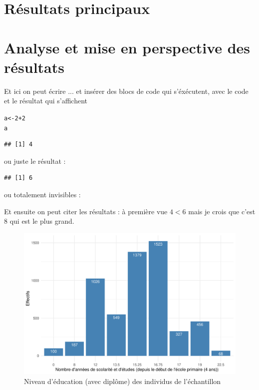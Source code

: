 \documentclass[a4paper, french, 11 pt]{article}\usepackage[]{graphicx}\usepackage[]{xcolor}
\makeatletter
\newcommand{\hlnum}[1]{\textcolor[rgb]{0.686,0.059,0.569}{#1}}%
\newcommand{\hlopt}[1]{\textcolor[rgb]{0,0,0}{#1}}%
\newcommand{\hlstd}[1]{\textcolor[rgb]{0.345,0.345,0.345}{#1}}%
\newcommand{\hlkwb}[1]{\textcolor[rgb]{0.69,0.353,0.396}{#1}}%
\newenvironment{kframe}{%
 \def\at@end@of@kframe{}%
 \ifinner\ifhmode%
  \def\at@end@of@kframe{\end{minipage}}%
  \begin{minipage}{\columnwidth}%
 \fi\fi%
 \def\FrameCommand##1{\hskip\@totalleftmargin \hskip-\fboxsep
 \colorbox{shadecolor}{##1}\hskip-\fboxsep
     \hskip-\linewidth \hskip-\@totalleftmargin \hskip\columnwidth}%
 \MakeFramed {\advance\hsize-\width
   \@totalleftmargin\z@ \linewidth\hsize
   \@setminipage}}%
 {\par\unskip\endMakeFramed%
 \at@end@of@kframe}
\newenvironment{knitrout}{}{} %
\makeatother
\begin{document}
\section{Résultats principaux}

\section{Analyse et mise en perspective des résultats}

Et ici on peut écrire ... et insérer des blocs de code qui s'éxécutent, avec le code et le résultat qui s'affichent

\begin{knitrout}
\color{fgcolor}\begin{kframe}
\begin{alltt}
\hlstd{a} \hlkwb{<-}  \hlnum{2}\hlopt{+}\hlnum{2}
\hlstd{a}
\end{alltt}
\begin{verbatim}
## [1] 4
\end{verbatim}
\end{kframe}
\end{knitrout}

ou juste le résultat : 

\begin{knitrout}
\color{fgcolor}\begin{kframe}
\begin{verbatim}
## [1] 6
\end{verbatim}
\end{kframe}
\end{knitrout}

ou totalement invisibles : 


Et ensuite on peut citer les résultats : à première vue $4 < 6$ mais je crois que c'est 8 qui est le plus grand.



\begin{figure}[h]
\center
\includegraphics[width=0.7\linewidth]{figure/educ.pdf}
\caption{Niveau d'éducation (avec diplôme) des individus de l'échantillon}
\end{figure}
\end{document}
